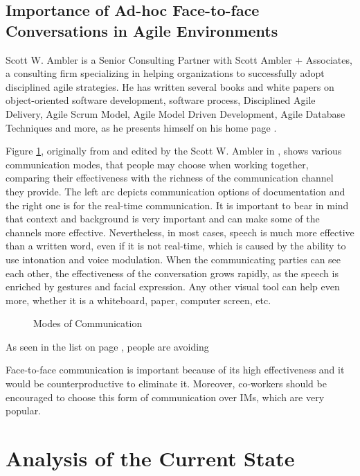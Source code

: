 \documentclass[11pt,singleside]{myfithesis2}
\newcommand{\pict}[4]{
	\begin{figure}[h!]
  		\vspace{-7px}
  		\centerline{\fcolorbox{darkgray}{palegray}{\texttt{[image: \#2]}}}
  		\caption{#1}
  		\label{#4}
	\end{figure}
}
\begin{document}
	\section{Importance of Ad-hoc Face-to-face Conversations in Agile Environments}
Scott W. Ambler is a Senior Consulting Partner with Scott Ambler + Associates, a consulting firm specializing in helping organizations to successfully adopt disciplined agile strategies. He has written several books and white papers on object-oriented software development, software process, Disciplined Agile Delivery, Agile Scrum Model, Agile Model Driven Development, Agile Database Techniques and more, as he presents himself on his home page \cite{ambler}.

Figure \ref{pic:commModes}, originally from \cite{agileCockburn} and edited by the Scott W. Ambler in \cite{roninInt}, shows various communication modes, that people may choose when working together, comparing their effectiveness with the richness of the communication channel they provide. The left arc depicts communication options of documentation and the right one is for the real-time communication. It is important to bear in mind that context and background is very important and can make some of the channels more effective. Nevertheless, in most cases, speech is much more effective than a written word, even if it is not real-time, which is caused by the ability to use intonation and voice modulation. When the communicating parties can see each other, the effectiveness of the conversation grows rapidly, as the speech is enriched by gestures and facial expression. Any other visual tool can help even more, whether it is a whiteboard, paper, computer screen, etc.

\pict{Modes of Communication \cite{roninInt}}{data/communicationModes.png}{width=0.8\textwidth}{pic:commModes}

As seen in the list on page \pageref{list:avoidingCommunication}, people are avoiding 




Face-to-face communication is important because of its high effectiveness and it would be counterproductive to eliminate it. Moreover, co-workers should be encouraged to choose this form of communication over IMs, which are very popular.
	
		
	
\chapter{Analysis of the Current State}
\end{document}
